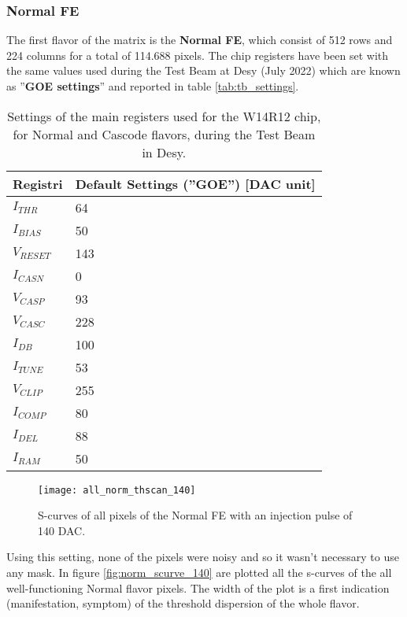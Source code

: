 \subsubsection{Normal FE}

The first flavor of the matrix is the \textbf{Normal FE}, which consist of 512 rows and 224 columns for a total of 114.688 pixels. The chip registers have been set with the same values used during the Test Beam at Desy (July 2022) which are known as ''\textbf{GOE settings}'' and reported in table \vref{tab:tb_settings}.


\begin{table}[h!]
\centering
\begin{tabular}{>{} C{3.5cm}|C{3.5cm}}
Registri & Default Settings (''GOE'') [DAC unit]\\[2ex]
\hline
$I_{THR}$ & 64 \\[0.5ex]
\hline
$I_{BIAS}$ & 50 \\
\hline
$V_{RESET}$ & 143 \\
\hline
$I_{CASN}$ & 0 \\
\hline
$V_{CASP}$ & 93 \\
\hline
$V_{CASC}$ & 228 \\
\hline
$I_{DB}$ & 100 \\
\hline
$I_{TUNE}$ & 53 \\
\hline
$V_{CLIP}$ & 255 \\
\hline
$I_{COMP}$ & 80 \\
\hline
$I_{DEL}$ & 88 \\
\hline
$I_{RAM}$ & 50 \\
\hline
\end{tabular}
\caption{Settings of the main registers used for the W14R12 chip, for Normal and Cascode flavors, during the Test Beam in Desy.}
\label{tab:tb_settings}
\end{table}


\begin{figure}[h!]
\centering
\texttt{[image: all\_norm\_thscan\_140]}
\caption{S-curves of all pixels of the Normal FE with an injection pulse of 140 DAC.}
\label{fig:norm_scurve_140}
\end{figure}

Using this setting, none of the pixels were noisy and so it wasn't necessary to use any mask.
In figure \vref{fig:norm_scurve_140} are plotted all the s-curves of the all well-functioning Normal flavor pixels. The width of the plot is a first indication (manifestation, symptom) of the threshold dispersion of the whole flavor.\\


